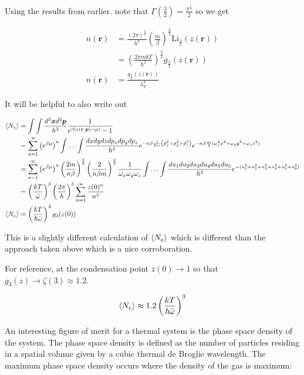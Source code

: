 \documentclass[12pt]{article}
\newcommand{\ep}{\epsilon}
\newcommand{\bv}[1]{\boldsymbol{#1}}
\begin{document}
Using the results from earlier. note that $\Gamma\left(\frac{3}{2}\right) = \frac{\pi^{\frac{1}{2}}}{2}$ so we get

\begin{align}
n(\bv{r}) &= \frac{(2\pi)^{\frac{3}{2}}}{h^3}\left(\frac{m}{\beta} \right)^{\frac{3}{2}} \text{Li}_{\frac{3}{2}}(z(\bv{r}))\\
&=\left(\frac{2\pi m k T}{h^2} \right)^{\frac{3}{2}} g_{\frac{3}{2}}(z(\bv{r}))\\
n(\bv{r}) &= \frac{g_{\frac{3}{2}}(z(\bv{r}))}{\lambda_T^3}
\end{align}

It will be helpful to also write out

\begin{align}
\braket{N_e} &= \int\int \frac{d^3 \bv{x} d^3\bv{p}}{h^3} \frac{1}{e^{\beta(\ep(\bv{r},\bv{p})-\mu)}-1}\\
&= \sum_{n=1}^{\infty} \left(e^{\beta\mu}\right)^n\int\ldots\int \frac{dxdydzdp_xdp_ydp_z}{h^3} e^{-n\beta\frac{1}{2m}\left(p_x^2 + p_y^2+p_z^2 \right)}e^{-n\beta \frac{m}{2}(\omega_x^2 x^2 +  \omega_y y^2 + \omega_z z^2)}\\
&= \sum_{n=1}^{\infty}\left(e^{\beta \mu}\right)^n \left(\frac{2m}{n\beta}\right)^{\frac{3}{2}}\left(\frac{2}{n \beta m}\right)^{\frac{3}{2}} \frac{1}{\omega_x\omega_y\omega_z} \int\ldots \int \frac{du_1du_2du_3du_4du_5du_5}{h^3} e^{-(u_1^2+u_2^2+u_3^2+u_4^2+u_5^2+u_6^2)}\\
&= \left(\frac{kT}{\bar{\omega}}\right)^3 \left(\frac{2\pi}{h}\right)^3 \sum_{n=1}^{\infty}\frac{z(0)^n}{n^3}\\
\Braket{N_e} &= \left(\frac{kT}{\hbar \bar{\omega}}\right)^3 g_3(z(0))
\end{align}

This is a slightly different calculation of $\Braket{N_e}$ which is different than the approach taken above which is a nice corroboration.

For reference, at the condensation point $z(0)\rightarrow 1$ so that $g_3(z) \rightarrow \zeta(3) \approx 1.2$.

\begin{align}
\braket{N_e} \approx 1.2 \left(\frac{kT}{\hbar\bar{\omega}}\right)^3
\end{align}

An interesting figure of merit for a thermal system is the phase space density of the system.
The phase space density is defined as the number of particles residing in a spatial volume given by a cubic thermal de Broglie wavelength.
The maximum phase space density occurs where the density of the gas is maximum:
\end{document}
